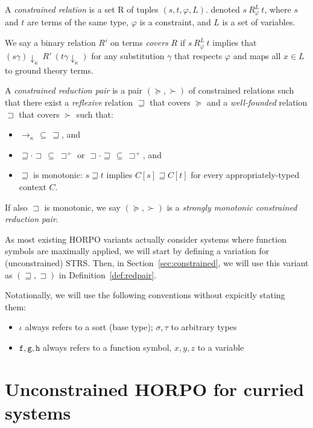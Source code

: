 \documentclass[a4paper,USenglish,cleveref,autoref,thm-restate]{lipics-v2021}
\newcommand{\gtvA}{L}
\newcommand{\downarrowcalc}{\downarrow_\kappa}
\newcommand{\arrz}{\rightarrow}
\newcommand{\arr}[1]{\arrz_{#1}}
\newcommand{\arrcalc}{\arr{\kappa}}
\newcommand{\grmain}{\sqsupset}
\newcommand{\geqmain}{\sqsupseteq}
\newcommand{\symb}[1]{\mathtt{#1}}
\newcommand{\afun}{\symb{f}}
\newcommand{\bfun}{\symb{g}}
\newcommand{\cfun}{\symb{h}}
\newcommand{\atype}{\sigma}
\newcommand{\btype}{\tau}
\newcommand{\asort}{\iota}
\newcommand{\avar}{x}
\newcommand{\bvar}{y}
\newcommand{\cvar}{z}
\begin{document}
\begin{definition}\label{def:redpair}
A \emph{constrained relation} is a set R of tuples $(s,t,\varphi,\gtvA)$. denoted $s\ 
R_\varphi^\gtvA\ t$, where $s$ and $t$ are terms of the same type, $\varphi$ is a constraint, and
$\gtvA$ is a set of variables.

We say a binary relation $R'$ on terms \emph{covers} $R$ if $s\ R_\varphi^\gtvA\ t$ implies that
$(s\gamma)\downarrowcalc\ R'\ (t\gamma\downarrowcalc)$ for any substitution $\gamma$ that respects
$\varphi$ and maps all $x \in \gtvA$ to ground theory terms.

A \emph{constrained reduction pair} is a pair $(\succeq,\succ)$ of constrained relations such that
there exist
a \emph{reflexive} relation $\geqmain$ that covers $\succeq$ and
a \emph{well-founded} relation $\grmain$ that covers $\succ$
such that:
\begin{itemize}
\item $\arrcalc\, \subseteq\, \geqmain$, and
\item $\geqmain \cdot \grmain\, \subseteq\, \grmain^+$ or
  $\grmain \cdot \geqmain\, \subseteq\, \grmain^+$, and
\item $\geqmain$ is monotonic: $s \geqmain t$ implies $C[s] \sqsupseteq C[t]$
  for every appropriately-typed context $C$.
\end{itemize}
If also $\grmain$ is monotonic, we say $(\succeq,\succ)$ is a \emph{strongly monotonic
constrained reduction pair}.
\end{definition}

As most existing HORPO variants actually consider systems where function symbols are maximally
applied, we will start by defining a variation for (unconstrained) STRS.
Then, in Section~\ref{sec:constrained}, we will use this variant as $(\geqmain,\grmain)$ in
Definition~\ref{def:redpair}.

Notationally, we will use the following conventions without expicitly stating them:
\begin{itemize}
\item $\asort$ always refers to a sort (base type); $\atype,\btype$ to arbitrary types
\item $\afun,\bfun,\cfun$ always refers to a function symbol, $\avar,\bvar,\cvar$ to a variable
\end{itemize}

\section{Unconstrained HORPO for curried systems}\label{sec:unconstrained}
\end{document}
